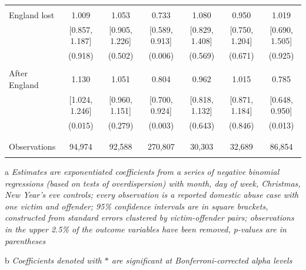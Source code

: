 \documentclass[12pt, a4paper]{article}
\begin{document}
\begin{table}
{\begin{threeparttable}
\begin{tabular}{@{\extracolsep{5pt}}lcccccc}
  & & & & & & \\ 
 England lost & 1.009 & 1.053 & 0.733 & 1.080 & 0.950 & 1.019 \\ 
  & [0.857, 1.187] & [0.905, 1.226] & [0.589, 0.913] & [0.829, 1.408] & [0.750, 1.204] & [0.690, 1.505] \\ 
  & (0.918) & (0.502) & (0.006) & (0.569) & (0.671) & (0.925) \\ 
  & & & & & & \\ 
 After England & 1.130 & 1.051 & 0.804 & 0.962 & 1.015 & 0.785 \\ 
  & [1.024, 1.246] & [0.960, 1.151] & [0.700, 0.924] & [0.818, 1.132] & [0.871, 1.184] & [0.648, 0.950] \\ 
  & (0.015) & (0.279) & (0.003) & (0.643) & (0.846) & (0.013) \\ 
  & & & & & & \\ 
\hline \\[-1.8ex] 
Observations & 94,974 & 92,588 & 270,807 & 30,303 & 32,689 & 86,854  \\ 
\hline \\[-1.8ex] 
\end{tabular} 
\begin{tablenotes}
      \item[a] \textit{Estimates are exponentiated coefficients from a series of negative binomial regressions (based on tests of overdispersion) with month, day of week, Christmas, New Year's eve controls; every observation is a reported domestic abuse case with one victim and offender; 95\% confidence intervals are in square brackets, constructed from standard errors clustered by victim-offender pairs; observations in the upper 2.5\% of the outcome variables have been removed, p-values are in parentheses}
          \item[b] \textit{Coefficients denoted with $*$ are significant at Bonferroni-corrected alpha levels}
    \end{tablenotes}
\end{threeparttable}   }
\end{table}
\end{document}
